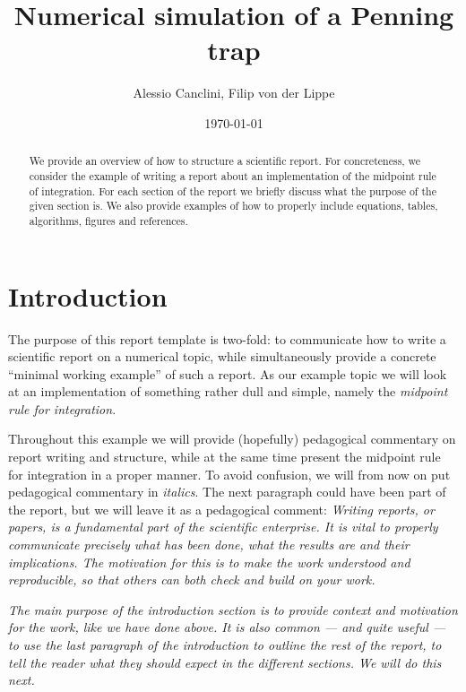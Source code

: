 \documentclass[english,notitlepage,reprint,nofootinbib]{revtex4-1}  %
\begin{document}
\title{Numerical simulation of a Penning trap}  %
\author{Alessio Canclini, Filip von der Lippe} %
\date{\today}                             %
\noaffiliation                            %

\begin{abstract}
    We provide an overview of how to structure a scientific report. For concreteness, we consider the example of writing a report about an implementation of the midpoint rule of integration. For each section of the report we briefly discuss what the purpose of the given section is. We also provide examples of how to properly include equations, tables, algorithms, figures and references.
\end{abstract}
\maketitle


\section{Introduction}
%
The purpose of this report template is two-fold: to communicate how to write a scientific report on a numerical topic, while simultaneously provide a concrete ``minimal working example'' of such a report. As our example topic we will look at an implementation of something rather dull and simple, namely the \textit{midpoint rule for integration}.

Throughout this example we will provide (hopefully) pedagogical commentary on report writing and structure, while at the same time present the midpoint rule for integration in a proper manner. To avoid confusion, we will from now on put pedagogical commentary in \textit{italics}. The next paragraph could have been part of the report, but we will leave it as a pedagogical comment: \textit{Writing reports, or papers, is a fundamental part of the scientific enterprise. It is vital to properly communicate precisely what has been done, what the results are and their implications. The motivation for this is to make the work understood and reproducible, so that others can both check and build on your work.}

\textit{The main purpose of the introduction section is to provide context and motivation for the work, like we have done above. It is also common --- and quite useful --- to use the last paragraph of the introduction to outline the rest of the report, to tell the reader what they should expect in the different sections. We will do this next.}
\end{document}

